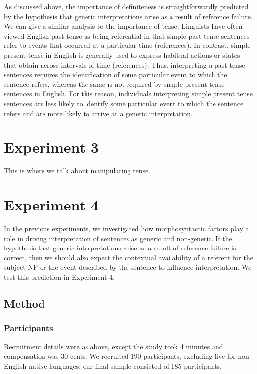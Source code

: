 \documentclass[10pt,letterpaper]{article}
\begin{document}
As discussed above, the importance of definiteness is straightforwardly predicted by the hypothesis that generic interpretations arise as a result of reference failure. We can give a similar analysis to the importance of tense. Linguists have often viewed English past tense as being referential in that simple past tense sentences refer to events that occurred at a particular time (references). In contrast, simple present tense in English is generally used to express habitual actions or states that obtain across intervals of time (references). Thus, interpreting a past tense sentences requires the identification of some particular event to which the sentence refers, whereas the same is not required by simple present tense sentences in English. For this reason, individuals interpreting simple present tense sentences are less likely to identify some particular event to which the sentence refers and are more likely to arrive at a generic interpretation.

\section{Experiment 3}

This is where we talk about manipulating tense.

\section{Experiment 4}

In the previous experiments, we investigated how morphosyntactic factors play a role in driving interpretation of sentences as generic and non-generic. If the hypothesis that generic interpretations arise as a result of reference failure is correct, then we should also expect the contextual availability of a referent for the subject NP or the event described by the sentence to influence interpretation. We test this prediction in Experiment 4.

\subsection{Method}

\subsubsection{Participants}

Recruitment details were as above, except the study took 4 minutes and compensation was 30 cents. We recruited 190 participants, excluding five for non-English native languages; our final sample consisted of 185 participants.
\end{document}
